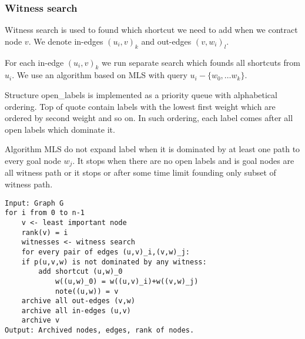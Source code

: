 \subsubsection{Witness search}

Witness search is used to found which shortcut we need to add when we contract 
node $v$. We denote in-edges $(u_i,v)_k$ and out-edges $(v,w_i)_l$.

For each in-edge $(u_i,v)_k$ we run separate search which founds all shortcuts from $u_i$.
We use an algorithm based on MLS with query $u_i-\{w_0,\dots w_k\}$. 

Structure open\_labels is implemented as a priority queue with alphabetical ordering. 
Top of quote contain labels with the lowest first weight which are ordered by second weight and so on. 
In such ordering, each label comes after all open labels which dominate it.

Algorithm MLS do not expand label when it is dominated by at least one path to every goal node $w_j$. 
It stops when there are no open labels and is goal nodes are all witness path
or it stops or after some time limit founding only subset of witness path. 

\begin{lstlisting}[caption={MCHp},label=MCHp,captionpos=t,float,abovecaptionskip=-\medskipamount]
Input: Graph G
for i from 0 to n-1
    v <- least important node
    rank(v) = i
    witnesses <- witness search
    for every pair of edges (u,v)_i,(v,w)_j:
    if p(u,v,w) is not dominated by any witness:
        add shortcut (u,w)_0
            w((u,w)_0) = w((u,v)_i)+w((v,w)_j)
            note((u,w)) = v
    archive all out-edges (v,w) 
    archive all in-edges (u,v)
    archive v
Output: Archived nodes, edges, rank of nodes.
\end{lstlisting}
